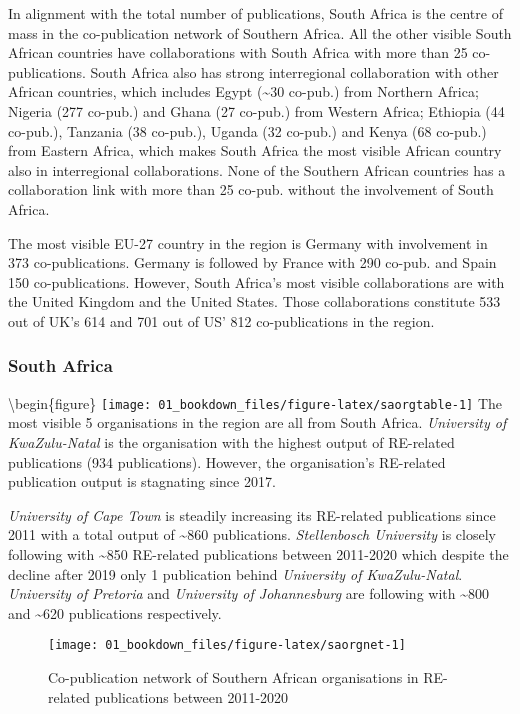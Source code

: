 \documentclass[12pt,twoside]{report}
\begin{document}
In alignment with the total number of publications, South Africa is the centre of mass in the co-publication network of Southern Africa. All the other visible South African countries have collaborations with South Africa with more than 25 co-publications. South Africa also has strong interregional collaboration with other African countries, which includes Egypt (\textasciitilde30 co-pub.) from Northern Africa; Nigeria (277 co-pub.) and Ghana (27 co-pub.) from Western Africa; Ethiopia (44 co-pub.), Tanzania (38 co-pub.), Uganda (32 co-pub.) and Kenya (68 co-pub.) from Eastern Africa, which makes South Africa the most visible African country also in interregional collaborations. None of the Southern African countries has a collaboration link with more than 25 co-pub. without the involvement of South Africa.

The most visible EU-27 country in the region is Germany with involvement in 373 co-publications. Germany is followed by France with 290 co-pub. and Spain 150 co-publications. However, South Africa's most visible collaborations are with the United Kingdom and the United States. Those collaborations constitute 533 out of UK's 614 and 701 out of US' 812 co-publications in the region.

\hypertarget{south-africa}{%
\subsubsection{South Africa}\label{south-africa}}

\textbackslash begin\{figure\}
\texttt{[image: 01\_bookdown\_files/figure-latex/saorgtable-1]}
The most visible 5 organisations in the region are all from South Africa. \emph{University of KwaZulu-Natal} is the organisation with the highest output of RE-related publications (934 publications). However, the organisation's RE-related publication output is stagnating since 2017.

\emph{University of Cape Town} is steadily increasing its RE-related publications since 2011 with a total output of \textasciitilde860 publications. \emph{Stellenbosch University} is closely following with \textasciitilde850 RE-related publications between 2011-2020 which despite the decline after 2019 only 1 publication behind \emph{University of KwaZulu-Natal}. \emph{University of Pretoria} and \emph{University of Johannesburg} are following with \textasciitilde800 and \textasciitilde620 publications respectively.

\begin{figure}
\texttt{[image: 01\_bookdown\_files/figure-latex/saorgnet-1]} \caption{Co-publication network of Southern African organisations in RE-related publications between 2011-2020}\label{fig:saorgnet}
\end{figure}
\end{document}
